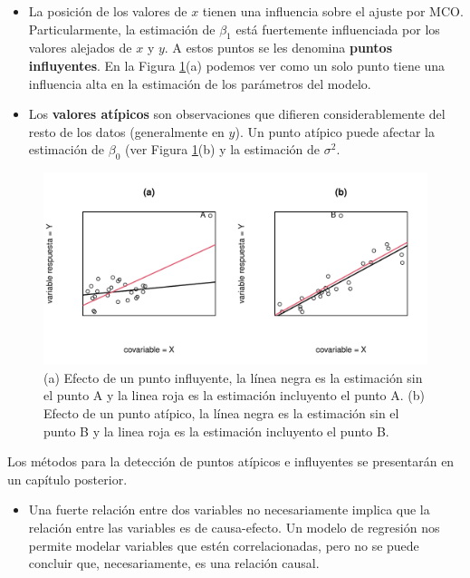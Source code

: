 \documentclass[
]{article}
\providecommand{\tightlist}{%
  \setlength{\itemsep}{0pt}\setlength{\parskip}{0pt}}
\begin{document}
\begin{itemize}
\item
  La posición de los valores de \(x\) tienen una influencia sobre el ajuste por MCO. Particularmente, la estimación de \(\beta_{1}\) está fuertemente influenciada por los valores alejados de \(x\) y \(y\). A estos puntos se les denomina \textbf{puntos influyentes}. En la Figura \ref{fig:influyentes}(a) podemos ver como un solo punto tiene una influencia alta en la estimación de los parámetros del modelo.
\item
  Los \textbf{valores atípicos} son observaciones que difieren considerablemente del resto de los datos (generalmente en \(y\)). Un punto atípico puede afectar la estimación de \(\beta_{0}\) (ver Figura \ref{fig:influyentes}(b) y la estimación de \(\sigma^{2}\).
\end{itemize}

\begin{figure}

{\centering \includegraphics{MLG1_files/figure-latex/influyentes-1} 

}

\caption{(a) Efecto de un punto influyente, la línea negra  es la estimación sin el punto A y la linea roja es la estimación incluyento el punto A. (b) Efecto de un punto atípico, la línea negra  es la estimación sin el punto B y la linea roja es la estimación incluyento el punto B.}\label{fig:influyentes}
\end{figure}

Los métodos para la detección de puntos atípicos e influyentes se presentarán en un capítulo posterior.

\begin{itemize}
\tightlist
\item
  Una fuerte relación entre dos variables no necesariamente implica que la relación entre las variables es de causa-efecto. Un modelo de regresión nos permite modelar variables que estén correlacionadas, pero no se puede concluir que, necesariamente, es una relación causal.
\end{itemize}
\end{document}
